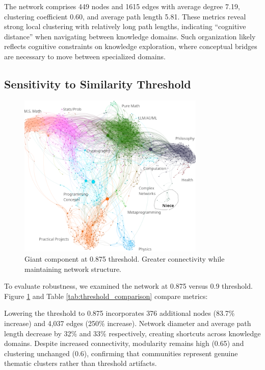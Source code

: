 \documentclass{svproc}
\begin{document}
The network comprises 449 nodes and 1615 edges with average degree 7.19, clustering coefficient 0.60, and average path length 5.81. These metrics reveal strong local clustering with relatively long path lengths, indicating ``cognitive distance'' when navigating between knowledge domains. Such organization likely reflects cognitive constraints on knowledge exploration, where conceptual bridges are necessary to move between specialized domains.

\subsection{Sensitivity to Similarity Threshold}
\label{threshold_sensitivity}

\begin{figure}[h]
\centering
\includegraphics[width=3.5in]{./images/0.875-wild-better.png}
\caption{Giant component at 0.875 threshold. Greater connectivity while maintaining network structure.}
\label{fig:threshold_comparison}
\end{figure}

To evaluate robustness, we examined the network at 0.875 versus 0.9 threshold. Figure \ref{fig:threshold_comparison} and Table \ref{tab:threshold_comparison} compare metrics:

Lowering the threshold to 0.875 incorporates 376 additional nodes (83.7\% increase) and 4,037 edges (250\% increase). Network diameter and average path length decrease by 32\% and 33\% respectively, creating shortcuts across knowledge domains. Despite increased connectivity, modularity remains high (0.65) and clustering unchanged (0.6), confirming that communities represent genuine thematic clusters rather than threshold artifacts.
\end{document}

